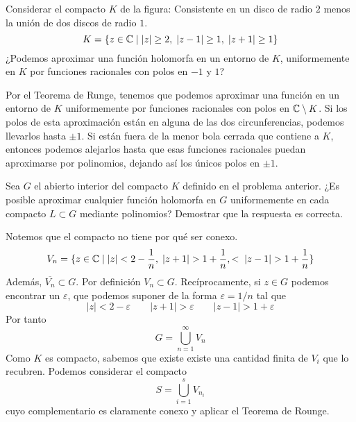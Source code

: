 \documentclass[twoside]{article}
\begin{document}
\begin{ejercicio}{7}
Considerar el compacto $K$ de la figura: Consistente en un disco de radio $2$ menos la unión de dos discos de radio $1$.
$$
K=\{z\in \mathbb{C}\mid |z|\geq 2, \; |z-1|\geq 1,\; |z+1|\geq 1\}
$$
¿Podemos aproximar una función holomorfa en un entorno de $K$, uniformemente en $K$ por funciones racionales con polos en $-1$ y $1$?
\end{ejercicio}
\begin{solucion}
Por el Teorema de Runge, tenemos que podemos aproximar una función en un entorno de $K$ uniformemente por funciones racionales con polos en $\mathbb{C}\setminus K$. Si los polos de esta aproximación están en alguna de las dos circunferencias, podemos llevarlos hasta $\pm 1$. Si están fuera de la menor bola cerrada que contiene a $K$, entonces podemos alejarlos hasta que esas funciones racionales puedan aproximarse por polinomios, dejando así los únicos polos en $\pm 1$.
\end{solucion}
\newpage


\begin{ejercicio}{8}
Sea $G$ el abierto interior del compacto $K$ definido en el problema anterior. ¿Es posible aproximar cualquier función holomorfa en $G$ uniformemente en cada compacto $L\subset G$ mediante polinomios? Demostrar que la respuesta es correcta.
\end{ejercicio}
\begin{solucion}
Notemos que el compacto no tiene por qué ser conexo.
$$
V_n = \{z\in \C\mid |z|<2-\frac{1}{n},\; |z+1|>1+\frac{1}{n},<\; |z-1|>1+\frac{1}{n}\}
$$
Además, $\overline{V_n}\subset G$.
Por definición $V_n \subset G$. Recíprocamente, si $z\in G$ podemos encontrar un $\varepsilon$, que podemos suponer de la forma $\varepsilon=1/n$ tal que
$$
|z|<2-\varepsilon \qquad |z+1|>\varepsilon \qquad |z-1|>1+\varepsilon 
$$
Por tanto
$$
G = \bigcup_{n=1}^\infty V_n
$$
Como $K$ es compacto, sabemos que existe existe una cantidad finita de $V_i$ que lo recubren. Podemos considerar el compacto
$$
S= \bigcup_{i=1}^s V_{n_i}
$$
cuyo complementario es claramente conexo y aplicar el Teorema de Rounge.
\end{solucion}
\newpage
\end{document}

